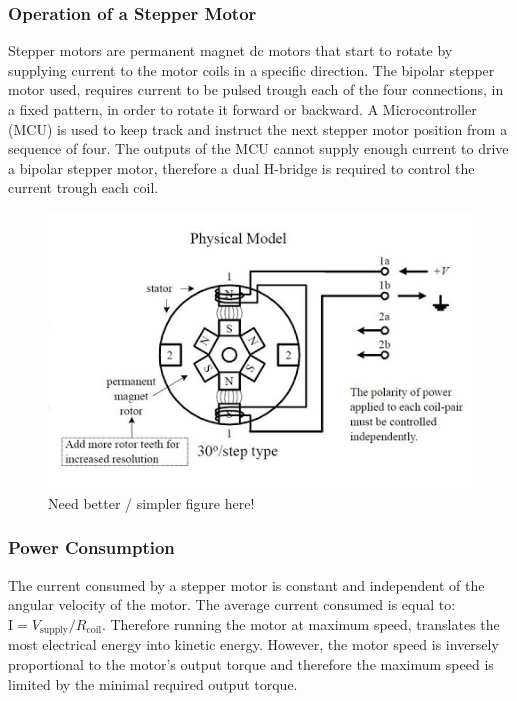 \subsubsection{Operation of a Stepper Motor}
Stepper motors are permanent magnet dc motors that start to rotate by supplying current to the motor coils in a specific direction.
The bipolar stepper motor used, requires current to be pulsed trough each of the four connections, in a fixed pattern, in order to rotate it forward or backward.
A Microcontroller (MCU) is used to keep track and instruct the next stepper motor position from a sequence of four.
The outputs of the MCU cannot supply enough current to drive a bipolar stepper motor, therefore a dual H-bridge is required to control the current trough each coil.

\begin{figure}
	\centering
	\includegraphics[width=\textwidth]{pics/bipolar_stepper.png}
	\caption{Need better / simpler figure here!}
	\label{fig:bipolarstepper}
\end{figure}

\subsubsection{Power Consumption}
The current consumed by a stepper motor is constant and independent of the angular velocity of the motor.
The average current consumed is equal to: $\textrm{I} = V_{\text{supply}}/R_{\text{coil}}$.
Therefore running the motor at maximum speed, translates the most electrical energy into kinetic energy.
However, the motor speed is inversely proportional to the motor's output torque and therefore the maximum speed is limited by the minimal required output torque.

